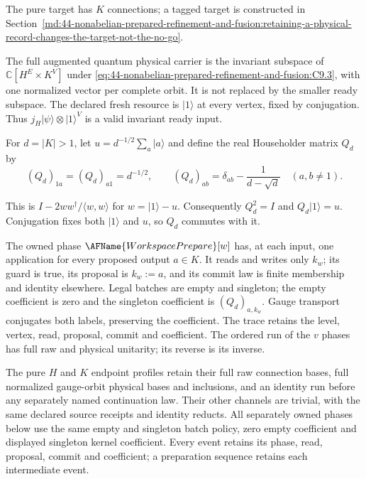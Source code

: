The pure target has $K$ connections; a tagged target is constructed in
Section~\ref{md:44-nonabelian-prepared-refinement-and-fusion:retaining-a-physical-record-changes-the-target-not-the-no-go}.

The full augmented quantum physical carrier is the invariant subspace of
$\mathbb C[H^E\times K^V]$ under
\eqref{eq:44-nonabelian-prepared-refinement-and-fusion:C9.3}, with one
normalized vector per complete orbit.  It is not replaced by the smaller ready
subspace.  The declared fresh resource is $|1\rangle$ at every vertex, fixed
by conjugation.  Thus $j_H|\psi\rangle\otimes|1\rangle^{V}$ is a valid
invariant ready input.

For $d=|K|>1$, let $u=d^{-1/2}\sum_a|a\rangle$ and define the real Householder
matrix $Q_d$ by
\begin{equation}
(Q_d)_{1a}=(Q_d)_{a1}=d^{-1/2},\qquad
 (Q_d)_{ab}=\delta_{ab}-\frac1{d-\sqrt d}\quad(a,b\ne1).
 \label{eq:44-nonabelian-prepared-refinement-and-fusion:C9.6}
\end{equation}

This is $I-2ww^\dagger/\langle w,w\rangle$ for $w=|1\rangle-u$.  Consequently
$Q_d^2=I$ and $Q_d|1\rangle=u$.  Conjugation fixes both $|1\rangle$ and $u$,
so $Q_d$ commutes with it.

The owned phase $\AFName{WorkspacePrepare}[w]$ has, at each input, one
application for every proposed output $a\in K$.  It reads and writes only
$k_w$; its guard is true, its proposal is $k_w:=a$, and its commit law is
finite membership and identity elsewhere.  Legal batches are empty and
singleton; the empty coefficient is zero and the singleton coefficient is
$(Q_d)_{a,k_w}$.  Gauge transport conjugates both labels, preserving the
coefficient.  The trace retains the level, vertex, read, proposal, commit and
coefficient.  The ordered run of the $v$ phases has full raw and physical
unitarity; its reverse is its inverse.

The pure $H$ and $K$ endpoint profiles retain their full raw connection bases,
full normalized gauge-orbit physical bases and inclusions, and an identity run
before any separately named continuation law.  Their other channels are
trivial, with the same declared source receipts and identity reducts.  All
separately owned phases below use the same empty and singleton batch policy,
zero empty coefficient and displayed singleton kernel coefficient.  Every event
retains its phase, read, proposal, commit and coefficient; a preparation
sequence retains each intermediate event.

